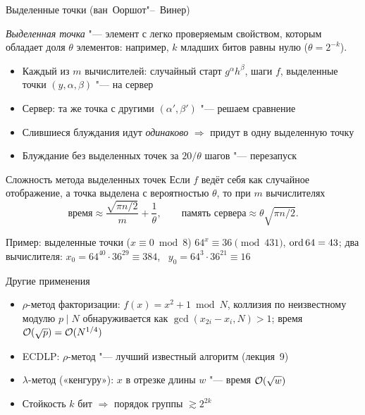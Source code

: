 \documentclass{ca-slides}
\begin{document}
\begin{canvasframe}[shrink=6]{Выделенные точки (ван~Ооршот"--~Винер)}
  \begin{definition}
    \emph{Выделенная точка} "--- элемент с легко проверяемым свойством, которым обладает
    доля $\theta$ элементов: например, $k$ младших битов равны нулю ($\theta = 2^{-k}$).
  \end{definition}
  \begin{itemize}
    \item Каждый из $m$ вычислителей: случайный старт $g^{\alpha}h^{\beta}$, шаги $f$,
      выделенные точки $(y, \alpha, \beta)$ "--- на сервер
    \item Сервер: та же точка с другими $(\alpha', \beta')$ "--- решаем сравнение
    \item Слившиеся блуждания идут \emph{одинаково} $\Rightarrow$ придут в одну выделенную
      точку
    \item Блуждание без выделенных точек за $20/\theta$ шагов "--- перезапуск
  \end{itemize}
\end{canvasframe}

\begin{theoremframe}{Сложность метода выделенных точек}
  Если $f$ ведёт себя как случайное отображение, а точка выделена с вероятностью $\theta$,
  то при $m$ вычислителях
  \[\text{время} \approx \frac{\sqrt{\pi n/2}}{m} + \frac1\theta, \qquad
    \text{память сервера} \approx \theta\sqrt{\pi n/2}.\]
\end{theoremframe}

\begin{canvasframe}{Пример: выделенные точки ($x \equiv 0 \bmod 8$)}
  \small
  $64^x \equiv 36 \pmod{431}$, $\operatorname{ord} 64 = 43$; два вычислителя:
  $x_0 = 64^{40} \cdot 36^{29} \equiv 384$, \ $y_0 = 64^{3} \cdot 36^{21} \equiv 16$
  \notearea[0.42\textheight]
\end{canvasframe}

\begin{canvasframe}{Другие применения}
  \begin{itemize}
    \item $\rho$-метод факторизации: $f(x) = x^2 + 1 \bmod N$, коллизия по неизвестному
      модулю $p \mid N$ обнаруживается как $\gcd(x_{2i} - x_i, N) > 1$;
      время $\mathcal{O}(\sqrt p) = \mathcal{O}(N^{1/4})$
    \item ECDLP: $\rho$-метод "--- лучший известный алгоритм (лекция~9)
    \item $\lambda$-метод («кенгуру»): $x$ в отрезке длины $w$ "--- время $\mathcal{O}(\sqrt w)$
    \item Стойкость $k$ бит $\Rightarrow$ порядок группы $\gtrsim 2^{2k}$
  \end{itemize}
\end{canvasframe}
\end{document}
